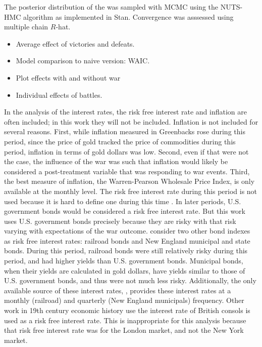 The posterior distribution of the was sampled with MCMC using the NUTS-HMC algorithm as implemented in Stan.
Convergence was asssessed using multiple chain $R$-hat.

\begin{itemize}
\item Average effect of victories and defeats.
\item Model comparison to naive version: WAIC.
\item Plot effects with and without war
\item Individual effects of battles.
\end{itemize}


In the analysis of the interest rates, the risk free interest rate and inflation are often included; in this work they will not be included.
Inflation is not included for several reasons.
First, while inflation measured in Greenbacks rose during this period, since the price of gold tracked the price of commodities during this period, inflation in terms of gold dollars was low\parencites{Mitchell1903}{Mitchell1908}. 
Second, even if that were not the case, the influence of the war was such that inflation would likely be considered a post-treatment variable that was responding to war events.
Third, the best measure of inflation, the Warren-Pearson Wholesale Price Index, is only available at the monthly level.
The risk free interest rate during this period is not used because it is hard to define one during this time \parencites{HomerSylla2005}.
In later periods, U.S. government bonds would be considered a risk free interest rate.
But this work uses U.S. government bonds precisely because they are risky with that risk varying with expectations of the war outcome.
\textcites{Macaulay1938}{HomerSylla2005} consider two other bond indexes as risk free interest rates: railroad bonds and New England municipal and state bonds.
During this period, railroad bonds were still relatively risky during this period, and had higher yields than U.S. government bonds.
Municipal bonds, when their yields are calculated in gold dollars, have yields similar to those of U.S. government bonds, and thus were not much less risky.
Additionally, the only available source of these interest rates, \textcite{Macaulay1938}, provides these interest rates at a monthly (railroad) and quarterly (New England municipals) frequency.
Other work in 19th century economic history use the interest rate of British consols is used as a risk free interest rate.
This is inappropriate for this analysis because that risk free interest rate was for the London market, and not the New York market.

